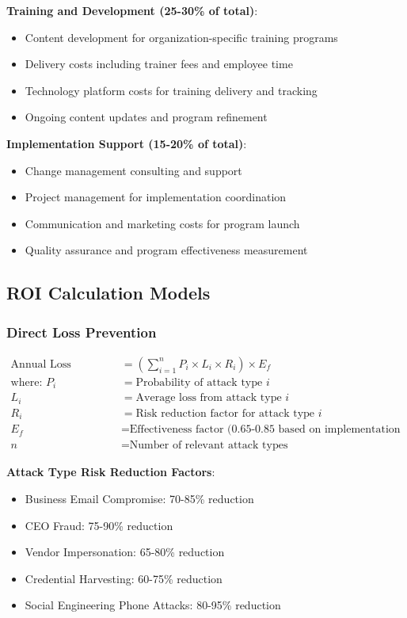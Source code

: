 \documentclass[11pt,a4paper]{article}
\begin{document}
\textbf{Training and Development (25-30\% of total)}:
\begin{itemize}
\item Content development for organization-specific training programs
\item Delivery costs including trainer fees and employee time
\item Technology platform costs for training delivery and tracking
\item Ongoing content updates and program refinement
\end{itemize}

\textbf{Implementation Support (15-20\% of total)}:
\begin{itemize}
\item Change management consulting and support
\item Project management for implementation coordination
\item Communication and marketing costs for program launch
\item Quality assurance and program effectiveness measurement
\end{itemize}

\subsection{ROI Calculation Models}

\subsubsection{Direct Loss Prevention}

\begin{align}
\text{Annual Loss Prevention} &= \left(\sum_{i=1}^{n} P_i \times L_i \times R_i\right) \times E_f \\
\text{where: } P_i &= \text{Probability of attack type } i \\
L_i &= \text{Average loss from attack type } i \\
R_i &= \text{Risk reduction factor for attack type } i \\
E_f &= \text{Effectiveness factor (0.65-0.85 based on implementation quality)} \\
n &= \text{Number of relevant attack types}
\end{align}

\textbf{Attack Type Risk Reduction Factors}:
\begin{itemize}
\item Business Email Compromise: 70-85\% reduction
\item CEO Fraud: 75-90\% reduction
\item Vendor Impersonation: 65-80\% reduction
\item Credential Harvesting: 60-75\% reduction
\item Social Engineering Phone Attacks: 80-95\% reduction
\end{itemize}
\end{document}
